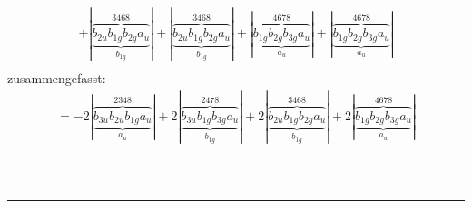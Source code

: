 \documentclass{article}
\begin{document}
\begin{multline*}
+\left|\underbrace{\overbrace{b_{2u} b_{1g} b_{2g} a_{u}}^{3 4 6 8}}_{b_{1g}}\right|+\left|\underbrace{\overbrace{b_{2u} b_{1g} b_{2g} a_{u}}^{3 4 6 8}}_{b_{1g}}\right|+\left|\underbrace{\overbrace{b_{1g} b_{2g} b_{3g} a_{u}}^{4 6 7 8}}_{a_{u}}\right|+\left|\underbrace{\overbrace{b_{1g} b_{2g} b_{3g} a_{u}}^{4 6 7 8}}_{a_{u}}\right|\\
\end{multline*}zusammengefasst:\begin{multline*}
=-2\left|\underbrace{\overbrace{b_{3u} b_{2u} b_{1g} a_{u}}^{2 3 4 8}}_{a_{u}}\right|+2\left|\underbrace{\overbrace{b_{3u} b_{1g} b_{3g} a_{u}}^{2 4 7 8}}_{b_{1g}}\right|+2\left|\underbrace{\overbrace{b_{2u} b_{1g} b_{2g} a_{u}}^{3 4 6 8}}_{b_{1g}}\right|+2\left|\underbrace{\overbrace{b_{1g} b_{2g} b_{3g} a_{u}}^{4 6 7 8}}_{a_{u}}\right|\\
\end{multline*}\\ \\
\hrule\newpage 
\end{document}
